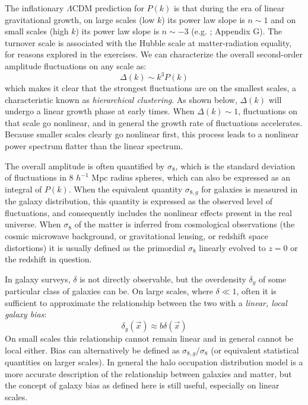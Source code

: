 The inflationary $\Lambda$CDM prediction for $P(k)$ is that during the
era of linear gravitational growth, on large scales (low $k$) its
power law slope is $n\sim 1$ and on small scales (high $k$) its power
law slope is $n\sim -3$ (e.g. \citealt{bardeen86a}; Appendix G). The
turnover scale is associated with the Hubble scale at matter-radiation
equality, for reasons explored in the exercises. We can characterize
the overall second-order amplitude fluctuations on any scale as:
\begin{equation}
\Delta(k) \sim k^3 P(k)
\end{equation}
which makes it clear that the strongest fluctuations are on the
smallest scales, a characteristic known as {\it hierarchical
clustering}. As shown below, $\Delta(k)$ will undergo a linear growth
phase at early times.  When $\Delta(k) \sim 1$, fluctuations on that
scale go nonlinear, and in general the growth rate of fluctuations
accelerates. Because smaller scales clearly go nonlinear first, this
process leads to a nonlinear power spectrum flatter than the linear
spectrum.

The overall amplitude is often quantified by $\sigma_8$, which is the
standard deviation of fluctuations in 8 $h^{-1}$ Mpc radius spheres,
which can also be expressed as an integral of $P(k)$. When the
equivalent quantity $\sigma_{8,g}$ for galaxies is measured in the
galaxy distribution, this quantity is expressed as the observed level
of fluctuations, and consequently includes the nonlinear effects
present in the real universe. When $\sigma_8$ of the matter is
inferred from cosmological observations (the cosmic microwave
background, or gravitational lensing, or redshift space distortions)
it is usually defined as the primordial $\sigma_8$ linearly evolved to
$z=0$ or the redshift in question.

In galaxy surveys, $\delta$ is not directly observable, but the
overdensity $\delta_g$ of some particular class of galaxies can be. On
large scales, where $\delta\ll 1$, often it is sufficient to
approximate the relationship between the two with a {\it linear, local
galaxy bias}:
\begin{equation}
\delta_g(\vec{x}) \approx b \delta(\vec{x})
\end{equation}
On small scales this relationship cannot remain linear and in general
cannot be local either. Bias can alternatively be defined as
$\sigma_{8,g} / \sigma_8$ (or equivalent statistical quantities on
larger scales). In general the halo occupation distribution model is a
more accurate description of the relationship between galaxies and
matter, but the concept of galaxy bias as defined here is still
useful, especially on linear scales.

